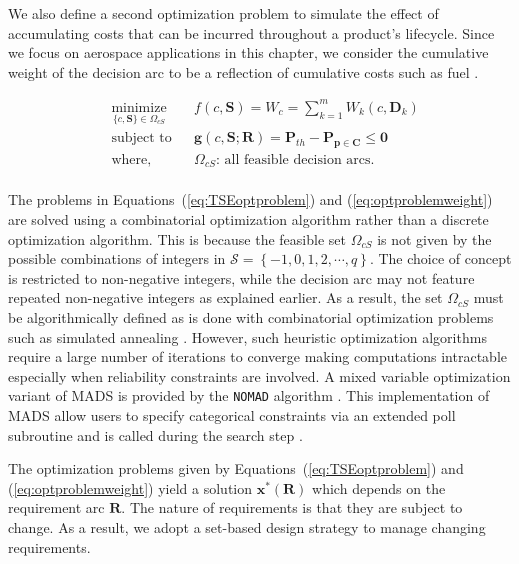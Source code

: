 We also define a second optimization problem to simulate the effect of accumulating costs that can be incurred throughout a product's lifecycle. Since we focus on aerospace applications in this chapter, we consider the cumulative weight of the decision arc to be a reflection of cumulative costs such as fuel \cite{Thomsen2016}.

\begin{equation}
	\label{eq:optproblemweight}
	\begin{aligned}
		& \underset{\{c,\mathbf{S}\}\in\Omega_{cS}}{\text{minimize}}
		& & {f}(c,\mathbf{S}) = W_c = \sum\limits_{k=1}^{m} W_{k}(c,\mathbf{D}_k)\\
		& \text{subject to}
		& & \mathbf{g}(c,\mathbf{S};\mathbf{R}) = \mathbf{P}_{th} - \mathbf{P}_{\mathbf{p} \in \mathbf{C}} \le \mathbf{0}\\
		& \text{where,}
		& & \Omega_{cS}\text{: all feasible decision arcs}.\\
	\end{aligned}
\end{equation}

The problems in Equations~(\ref{eq:TSEoptproblem}) and (\ref{eq:optproblemweight}) are solved using a combinatorial optimization algorithm rather than a discrete optimization algorithm. This is because the feasible set $\Omega_{cS}$ is not given by the possible combinations of integers in $\mathcal{S} = \left\{-1,0,1,2,\cdots,q\right\}$. The choice of concept is restricted to non-negative integers, while the decision arc may not feature repeated non-negative integers as explained earlier. As a result, the set $\Omega_{cS}$ must be algorithmically defined as is done with combinatorial optimization problems such as simulated annealing \cite{Kirkpatrick1983}. However, such heuristic optimization algorithms require a large number of iterations to converge making computations intractable especially when reliability constraints are involved. A mixed variable optimization variant of \ac{MADS} is provided by the \texttt{NOMAD} algorithm \cite{Abramson2009}. This implementation of \ac{MADS} allow users to specify categorical constraints via an extended poll subroutine and is called during the search step \cite{Abramson2004,Abramson2008}.

The optimization problems given by Equations~(\ref{eq:TSEoptproblem}) and (\ref{eq:optproblemweight}) yield a solution $\mathbf{x}^*(\mathbf{R})$ which depends on the requirement arc $\mathbf{R}$. The nature of requirements is that they are subject to change. As a result, we adopt a set-based design strategy to manage changing requirements.

